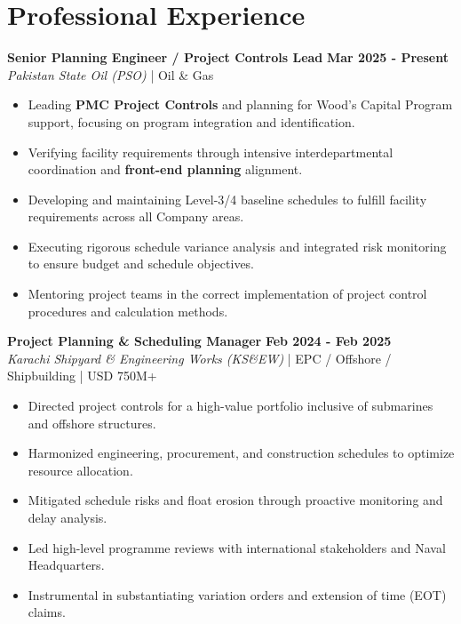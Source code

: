 \documentclass[11pt,a4paper]{article}
\begin{document}
\section{Professional Experience}
\noindent \textbf{\large Senior Planning Engineer / Project Controls Lead} \hfill \textbf{\color{awesome-blue}Mar 2025 - Present}\\
\textit{Pakistan State Oil (PSO)} | Oil \& Gas\\
\begin{itemize}
    \item Leading \textbf{PMC Project Controls} and planning for Wood's Capital Program support, focusing on program integration and identification.
    \item Verifying facility requirements through intensive interdepartmental coordination and \textbf{front-end planning} alignment.
    \item Developing and maintaining Level-3/4 baseline schedules to fulfill facility requirements across all Company areas.
    \item Executing rigorous schedule variance analysis and integrated risk monitoring to ensure budget and schedule objectives.
    \item Mentoring project teams in the correct implementation of project control procedures and calculation methods.
\end{itemize}

\noindent \textbf{\large Project Planning \& Scheduling Manager} \hfill \textbf{\color{awesome-blue}Feb 2024 - Feb 2025}\\
\textit{Karachi Shipyard \& Engineering Works (KS\&EW)} | EPC / Offshore / Shipbuilding | USD 750M+\\
\begin{itemize}
    \item Directed project controls for a high-value portfolio inclusive of submarines and offshore structures.
    \item Harmonized engineering, procurement, and construction schedules to optimize resource allocation.
    \item Mitigated schedule risks and float erosion through proactive monitoring and delay analysis.
    \item Led high-level programme reviews with international stakeholders and Naval Headquarters.
    \item Instrumental in substantiating variation orders and extension of time (EOT) claims.
\end{itemize}
\end{document}
